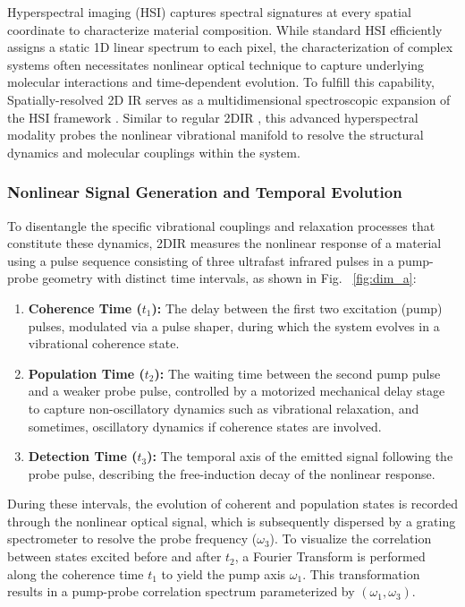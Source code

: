 \documentclass{optica-article}
\begin{document}
Hyperspectral imaging (HSI) captures spectral signatures at every spatial coordinate to characterize material composition. While standard HSI efficiently assigns a static 1D linear spectrum to each pixel, the characterization of complex systems often necessitates nonlinear optical technique to capture underlying molecular interactions and time-dependent evolution. To fulfill this capability, Spatially-resolved 2D IR serves as a multidimensional spectroscopic expansion of the HSI framework \cite{zanni2020hyperspectral}. Similar to regular 2DIR \cite{hamm1998structure,mukamel1995principles}, this advanced hyperspectral modality probes the nonlinear vibrational manifold to resolve the structural dynamics and molecular couplings within the system.

\subsubsection{Nonlinear Signal Generation and Temporal Evolution}

To disentangle the specific vibrational couplings and relaxation processes that constitute these dynamics, 2DIR measures the nonlinear response of a material using a pulse sequence consisting of three ultrafast infrared pulses in a pump-probe geometry with distinct time intervals, as shown in Fig. ~\ref{fig:dim_a}:

\begin{enumerate}
    \item \textbf{Coherence Time ($t_1$):} The delay between the first two excitation (pump) pulses, modulated via a pulse shaper, during which the system evolves in a vibrational coherence state.
    \item \textbf{Population Time ($t_2$):} The waiting time between the second pump pulse and a weaker probe pulse, controlled by a motorized mechanical delay stage to capture non-oscillatory dynamics such as vibrational relaxation, and sometimes, oscillatory dynamics if coherence states are involved.
    \item \textbf{Detection Time ($t_3$):} The temporal axis of the emitted signal following the probe pulse, describing the free-induction decay of the nonlinear response.
\end{enumerate}

During these intervals, the evolution of coherent and population states is recorded through the nonlinear optical signal, which is subsequently dispersed by a grating spectrometer to resolve the probe frequency ($\omega_3$). To visualize the correlation between states excited before and after $t_2$, a Fourier Transform is performed along the coherence time $t_1$ to yield the pump axis $\omega_1$. This transformation results in a pump-probe correlation spectrum parameterized by $(\omega_1, \omega_3)$.
\end{document}
